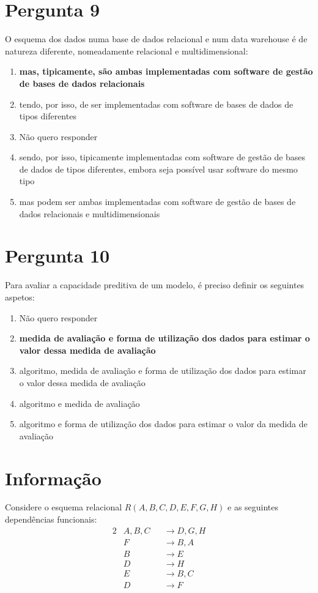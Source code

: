 \documentclass[type=recurso, year=2015/16]{bdad_exam}
\begin{document}
{\section{Pergunta 9}
O esquema dos dados numa base de dados relacional e num data warehouse é de natureza diferente, nomeadamente relacional e multidimensional:
\begin{enumerate}[label=\alph*.]\itemsep0em
    \item \textbf{mas, tipicamente, são ambas implementadas com software de gestão de bases de dados relacionais \greencheckmark}
    \item tendo, por isso, de ser implementadas com software de bases de dados de tipos diferentes
    \item Não quero responder
    \item sendo, por isso, tipicamente implementadas com software de gestão de bases de dados de tipos diferentes, embora seja possível usar software do mesmo tipo
    \item mas podem ser ambas implementadas com software de gestão de bases de dados relacionais e multidimensionais
\end{enumerate}

\section{Pergunta 10}
Para avaliar a capacidade preditiva de um modelo, é preciso definir os seguintes aspetos:
\begin{enumerate}[label=\alph*.]\itemsep0em
    \item Não quero responder
    \item \textbf{medida de avaliação e forma de utilização dos dados para estimar o valor dessa medida de avaliação \greencheckmark}
    \item algoritmo, medida de avaliação e forma de utilização dos dados para estimar o valor dessa medida de avaliação
    \item algoritmo e medida de avaliação
    \item algoritmo e forma de utilização dos dados para estimar o valor da medida de avaliação
\end{enumerate}

\newpage
\section*{Informação}
Considere o esquema relacional $R(A,B,C,D,E,F,G,H)$ e as seguintes dependências funcionais:
\begin{alignat*}{2}
    & A, B, C && \rightarrow D, G, H \\
    & F       && \rightarrow B, A    \\
    & B       && \rightarrow E       \\
    & D       && \rightarrow H       \\
    & E       && \rightarrow B, C    \\
    & D       && \rightarrow F
\end{alignat*}

}
\end{document}
